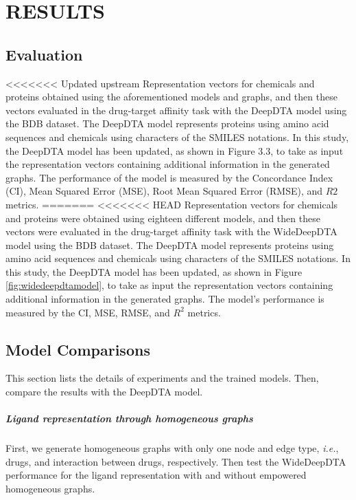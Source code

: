 \chapter{RESULTS}
\label{results}
\section{Evaluation}
<<<<<<< Updated upstream
Representation vectors for chemicals and proteins obtained using the aforementioned models and graphs, and then these vectors evaluated in the drug-target affinity task with the DeepDTA model using the BDB dataset. The DeepDTA model represents proteins using amino acid sequences and chemicals using characters of the SMILES notations. In this study, the DeepDTA model has been updated, as shown in Figure 3.3, to take as input the representation vectors containing additional information in the generated graphs. The performance of the model is measured by the Concordance Index (CI),  Mean Squared Error (MSE), Root Mean Squared Error (RMSE), and $R2$ metrics. 
=======
<<<<<<< HEAD
Representation vectors for chemicals and proteins were obtained using eighteen different models, and then these vectors were evaluated in the drug-target affinity task with the WideDeepDTA model using the BDB dataset. The DeepDTA \cite{ozturk2018deepdta} model represents proteins using amino acid sequences and chemicals using characters of the SMILES notations. In this study, the DeepDTA model has been updated, as shown in Figure \ref{fig:widedeepdtamodel}, to take as input the representation vectors containing additional information in the generated graphs. The model's performance is measured by the CI,  MSE, RMSE, and $R^2$ metrics. 

\section{Model Comparisons}
This section lists the details of experiments and the trained models. Then, compare the results with the DeepDTA model. 

\paragraph{Ligand representation through homogeneous graphs}
First, we generate homogeneous graphs with only one node and edge type, \textit{i.e.}, drugs, and interaction between drugs, respectively. Then test the WideDeepDTA performance for the ligand representation with and without empowered homogeneous graphs.

